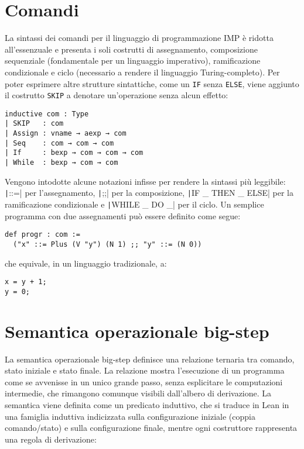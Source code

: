 \section{Comandi}
La sintassi dei comandi per il linguaggio di programmazione IMP è ridotta all'essenzuale e presenta i soli costrutti di assegnamento, composizione sequenziale (fondamentale per un linguaggio imperativo), ramificazione condizionale e ciclo (necessario a rendere il linguaggio Turing-completo). Per poter esprimere altre strutture sintattiche, come un \texttt{IF} senza \texttt{ELSE}, viene aggiunto il costrutto \texttt{SKIP} a denotare un'operazione senza alcun effetto:
\begin{verbatim}
inductive com : Type
| SKIP   : com
| Assign : vname → aexp → com
| Seq    : com → com → com
| If     : bexp → com → com → com
| While  : bexp → com → com
\end{verbatim}
Vengono intodotte alcune notazioni infisse per rendere la sintassi più leggibile: \texttt|::=| per l'assegnamento, \texttt|;;| per la composizione, \texttt|IF _ THEN _ ELSE| per la ramificazione condizionale e \texttt|WHILE _ DO _| per il ciclo.
Un semplice programma con due assegnamenti può essere definito come segue:
\begin{verbatim}
def progr : com :=
  ("x" ::= Plus (V "y") (N 1) ;; "y" ::= (N 0))
\end{verbatim}
che equivale, in un linguaggio tradizionale, a:
\begin{verbatim}
x = y + 1;
y = 0;
\end{verbatim}

\section{Semantica operazionale big-step}
La semantica operazionale big-step definisce una relazione ternaria tra comando, stato iniziale e stato finale. La relazione mostra l'esecuzione di un programma come se avvenisse in un unico grande passo, senza esplicitare le computazioni intermedie, che rimangono comunque visibili dall'albero di derivazione. La semantica viene definita come un predicato induttivo, che si traduce in Lean in una famiglia induttiva indicizzata sulla configurazione iniziale (coppia comando/stato) e sulla configurazione finale, mentre ogni costruttore rappresenta una regola di derivazione:
\begin{comment}
La definizione di una realazione è necessaria: una funzione di valutazione (un interprete) per IMP sarebbe per forza di cose una funzione parziale (ogni linguaggio Turing-completo ammette la non terminazione).
\end{comment}

